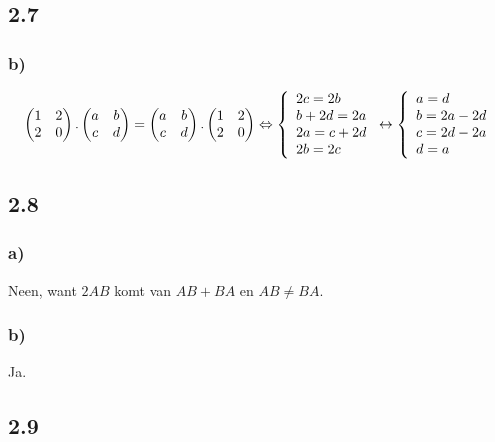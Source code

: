\documentclass[11pt]{article}
\begin{document}
\subsection*{2.7}
\subsubsection*{b)}
\[
\begin{pmatrix}
1 & 2 \\
2 & 0
\end{pmatrix}
.
\begin{pmatrix}
a & b \\
c & d
\end{pmatrix}
=
\begin{pmatrix}
a & b \\
c & d
\end{pmatrix}
.
\begin{pmatrix}
1 & 2 \\
2 & 0
\end{pmatrix}
\Leftrightarrow
\left\lbrace
\begin{array}{l l}
2c=2b\\
b+2d=2a\\
2a=c+2d\\
2b=2c
\end{array}
\right.
\leftrightarrow
\left\lbrace
\begin{array}{l l}
a=d\\
b=2a-2d\\
c=2d-2a\\
d=a
\end{array}
\right.
\]
\subsection*{2.8}
\subsubsection*{a)}
Neen, want $2AB$ komt van $AB+BA$ en $AB \neq BA$.
\subsubsection*{b)}
Ja.

\subsection*{2.9}
\end{document}
